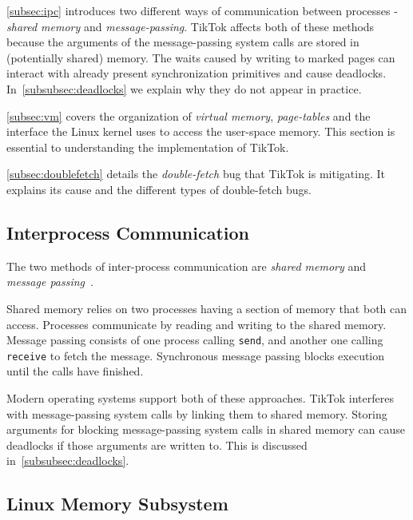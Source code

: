 \documentclass[conference]{IEEEtran}
\newcommand{\sysname}{TikTok}
\begin{document}
\autoref{subsec:ipc} introduces two different ways of communication between
processes - \emph{shared memory} and \emph{message-passing}. \sysname{} affects
both of these methods because the arguments of the message-passing system calls
are stored in (potentially shared) memory. The waits caused by writing to marked
pages can interact with already present synchronization primitives and cause
deadlocks. In~\autoref{subsubsec:deadlocks} we explain why they do not appear in
practice.

\autoref{subsec:vm} covers the organization of \emph{virtual memory},
\emph{page-tables} and the interface the Linux kernel uses to access the
user-space memory. This section is essential to understanding the implementation
of \sysname.

\autoref{subsec:doublefetch} details the \emph{double-fetch} bug that \sysname{}
is mitigating. It explains its cause and the different types of double-fetch bugs.


\subsection{Interprocess Communication}
\label{subsec:ipc}

The two methods of inter-process communication are  \emph{shared memory} 
and \emph{message passing}~\cite{silberschatz2018operating}.

Shared memory relies on two processes having a section of memory that both can 
access. Processes communicate by reading and writing to the shared memory.
Message passing consists of one process calling \texttt{send}, and another one
calling \texttt{receive} to fetch the message. Synchronous message passing
blocks execution until the calls have finished.

Modern operating systems support both of these approaches. \sysname{} interferes
with message-passing system calls by linking them to shared memory. Storing
arguments for blocking message-passing system calls in shared memory can cause
deadlocks if those arguments are written to. This is discussed in~\autoref{subsubsec:deadlocks}.

\subsection{Linux Memory Subsystem}
\label{subsec:vm}
\end{document}
